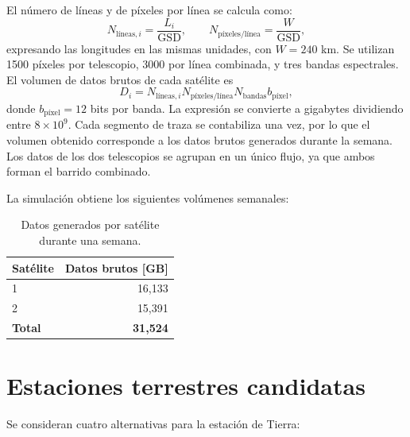 El número de líneas y de píxeles por línea se calcula como:
\begin{equation}
N_{\text{líneas},i}=\frac{L_i}{\mathrm{GSD}},
\qquad
N_{\text{píxeles/línea}}=\frac{W}{\mathrm{GSD}},
\label{eq:data_pixels}
\end{equation}
expresando las longitudes en las mismas unidades, con \(W=240\) km. Se utilizan 1500 píxeles por telescopio, 3000 por línea combinada, y tres bandas espectrales. El volumen de datos brutos de cada satélite es
\begin{equation}
D_i=N_{\text{líneas},i}
N_{\text{píxeles/línea}}
N_{\text{bandas}}b_{\text{píxel}},
\label{eq:data_per_satellite}
\end{equation}
donde \(b_{\text{píxel}}=12\) bits por banda. La expresión se convierte a gigabytes dividiendo entre \(8\times10^9\). Cada segmento de traza se contabiliza una vez, por lo que el volumen obtenido corresponde a los datos brutos generados durante la semana. Los datos de los dos telescopios se agrupan en un único flujo, ya que ambos forman el barrido combinado.

La simulación obtiene los siguientes volúmenes semanales:

\begin{table}[H]
\centering
\caption{Datos generados por satélite durante una semana.}
\label{tab:data_per_satellite}
\begin{tabular}{@{}lr@{}}
\toprule
Satélite & Datos brutos [GB] \\
\midrule
1 & 16,133 \\
2 & 15,391 \\
\midrule
\textbf{Total} & \textbf{31,524} \\
\bottomrule
\end{tabular}
\end{table}

\section{Estaciones terrestres candidatas}

Se consideran cuatro alternativas para la estación de Tierra:

